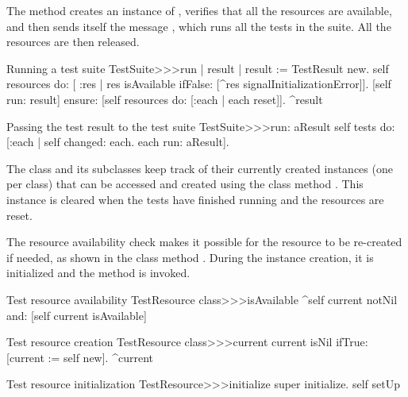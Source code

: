 \documentclass[a4paper,10pt,twoside]{book}
\begin{document}
{{The method  creates an instance of
, verifies that all the resources are available, and then sends itself
the message , which runs all
the tests in the suite.  All the resources are then
released.
\begin{method}[testsuiterun]{Running a test suite}
TestSuite>>>run
	| result |
 	result := TestResult new.
	self resources do: [ :res |
		res isAvailable ifFalse: [^res signalInitializationError]].
	[self run: result] ensure: [self resources do: [:each | each reset]].
	^result
\end{method}

\begin{method}[testsuiterun:]{Passing the test result to the test suite}
TestSuite>>>run: aResult
	self tests do: [:each | 
		self changed: each.
		each run: aResult].
\end{method}
The class  and its subclasses keep track of
their currently created instances (one per class) that can be accessed
and created using the class method .  This instance is
cleared when the tests have finished running and the resources are
reset.

The resource availability check makes it possible for the resource to be 
re-created if needed, as shown in the class method .  During the 
instance creation, it is initialized and the method  is
invoked.


\begin{method}[testresourceisavailable]{Test resource availability}
TestResource class>>>isAvailable
	^self current notNil and: [self current isAvailable]
\end{method}
\begin{method}[testresourcecurrent]{Test resource creation}
TestResource class>>>current
	current isNil ifTrue: [current := self new].
	^current
\end{method}
\begin{method}[restresourceinitialize]{Test resource initialization}
TestResource>>>initialize
	super initialize.
	self setUp
\end{method}

}}
\end{document}
